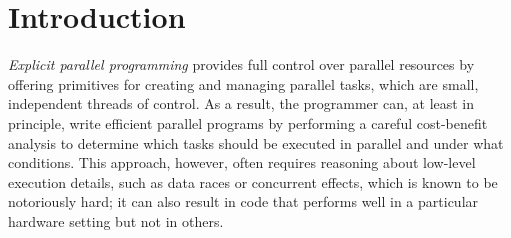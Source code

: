 \section{Introduction}
\label{sec:introduction}

{\em Explicit parallel programming} provides full control over
parallel resources by offering primitives for creating and managing
parallel tasks, which are small, independent threads of control.   %
As a result, the programmer can, at least in principle, write efficient
parallel programs by performing a careful cost-benefit analysis to
determine which tasks should be executed in parallel and under what
conditions.  This approach, however, often requires reasoning about
low-level execution details, such as data races or concurrent effects,
which is known to be notoriously hard; it can also result in code that
performs well in a particular hardware setting but not in others.

